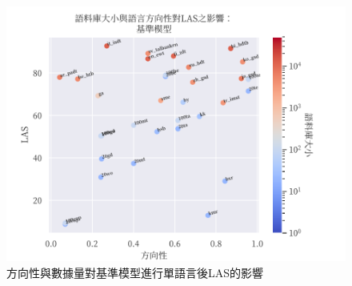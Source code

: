 \begin{figure}[h]
    \centering
    \includegraphics{figs/chapter3/dir_size_las_ft_multi.pdf}
    \caption{方向性與數據量對基準模型進行單語言\finetune 後LAS的影響}
    \label{fig:dir-size-las-ft-multi}
\end{figure}